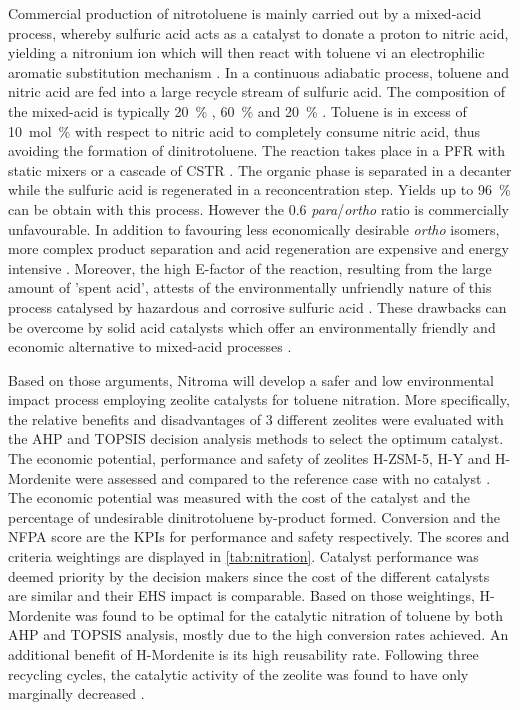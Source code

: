 Commercial production of nitrotoluene is mainly carried out by a mixed-acid process, whereby sulfuric acid acts as a catalyst to donate a proton to nitric acid, yielding a nitronium ion which will then react with toluene vi an electrophilic aromatic substitution mechanism \cite{halder_nitration_2007}. In a continuous adiabatic process, toluene and nitric acid are fed into a large recycle stream of sulfuric acid. The composition of the mixed-acid is typically \SI{20}{\percent} , \SI{60}{\percent}  and \SI{20}{\percent}  \cite{pande_nitration_2010}. Toluene is in excess of \SI{10}{mol\percent} with respect to nitric acid to completely consume nitric acid, thus avoiding the formation of dinitrotoluene. The reaction takes place in a PFR with static mixers or a cascade of CSTR \cite{dugal_nitrobenzene_2005}. The organic phase is separated in a decanter while the sulfuric acid is regenerated in a reconcentration step. Yields up to \SI{96}{\percent} can be obtain with this process. However the 0.6 \textit{para}/\textit{ortho} ratio is commercially unfavourable. In addition to favouring less economically desirable \textit{ortho} isomers, more complex product separation and acid regeneration are expensive and energy intensive \cite{sreedhar_scientific_2013}. 
Moreover, the high E-factor of the reaction, resulting from the large amount of 'spent acid', attests of the environmentally unfriendly nature of this process catalysed by hazardous and corrosive sulfuric acid \cite{pande_nitration_2010}. These drawbacks can be overcome by solid acid catalysts which offer an environmentally friendly and economic alternative to mixed-acid processes \cite{vassena_selective_1999}.


 Based on those arguments, Nitroma will develop a safer and low environmental impact process employing zeolite catalysts for toluene nitration. More specifically, the relative benefits and disadvantages of 3 different zeolites were evaluated with the AHP and TOPSIS decision analysis methods to select the optimum catalyst. The economic potential, performance and safety of zeolites H-ZSM-5, H-Y and H-Mordenite were assessed and compared to the reference case with no catalyst \cite{jeeru_kinetics_2018}. The economic potential was measured with the cost of the catalyst and the percentage of undesirable dinitrotoluene by-product formed. Conversion and the NFPA score are the KPIs for performance and safety respectively. The scores and criteria weightings are displayed in \cref{tab:nitration}. Catalyst performance was deemed priority by the decision makers since the cost of the different catalysts are similar and their EHS impact is comparable. Based on those weightings, H-Mordenite was found to be optimal for the catalytic nitration of toluene by both AHP and TOPSIS analysis, mostly due to the high conversion rates achieved. An additional benefit of H-Mordenite is its high reusability rate. Following three recycling cycles, the catalytic activity of the zeolite was found to have only marginally decreased \cite{jeeru_kinetics_2018}. 


